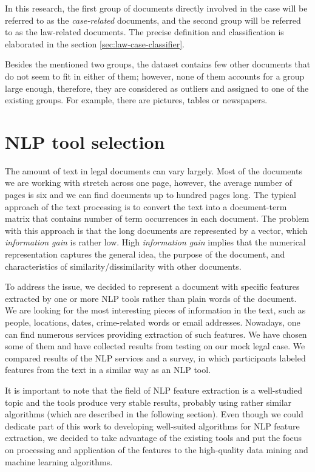 \documentclass[
  digital, %
  notable,   %
  nolof,     %
  nolot,     %
  draft
]{fithesis3}
\begin{document}
In this research, the first group of documents directly involved in the case will be referred to as the \textit{case-related} documents, and the second group will be referred to as the law-related documents.
The precise definition and classification is elaborated in the section \ref{sec:law-case-classifier}.

Besides the mentioned two groups, the dataset contains few other documents that do not seem to fit in either of them; however, none of them accounts for a group large enough, therefore, they are considered as outliers and assigned to one of the existing groups.
For example, there are pictures, tables or newspapers.

\chapter{NLP tool selection}
The amount of text in legal documents can vary largely.
Most of the documents we are working with stretch across one page, however, the average number of pages is six and we can find documents up to hundred pages long.
The typical approach of the text processing is to convert the text into a document-term matrix that contains number of term occurrences in each document.
The problem with this approach is that the long documents are represented by a vector, which \emph{information gain} is rather low.
High \emph{information gain} implies that the numerical representation captures the general idea, the purpose of the document, and characteristics of similarity/dissimilarity with other documents.

To address the issue, we decided to represent a document with specific features extracted by one or more NLP tools rather than plain words of the document.
We are looking for the most interesting pieces of information in the text, such as people, locations, dates, crime-related words or email addresses.
Nowadays, one can find numerous services providing extraction of such features.
We have chosen some of them and have collected results from testing on our mock legal case.
We compared results of the NLP services and a survey, in which participants labeled features from the text in a similar way as an NLP tool.

It is important to note that the field of NLP feature extraction is a well-studied topic and the tools produce very stable results, probably using rather similar algorithms (which are described in the following section). Even though we could dedicate part of this work to developing well-suited algorithms for NLP feature extraction, we decided to take advantage of the existing tools and put the focus on processing and application of the features to the high-quality data mining and machine learning algorithms. 
\end{document}
